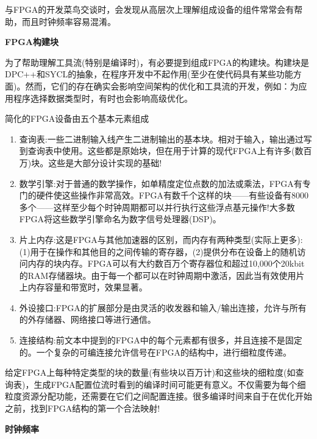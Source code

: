 与FPGA的开发菜鸟交谈时，会发现从高层次上理解组成设备的组件常常会有帮助，而且时钟频率容易混淆。\par

\hspace*{\fill} \par %
\textbf{FPGA构建块}

为了帮助理解工具流(特别是编译时)，有必要提到组成FPGA的构建块。构建块是DPC++和SYCL的抽象，在程序开发中不起作用(至少在使代码具有某些功能方面)。然而，它们的存在确实会影响空间架构的优化和工具流的开发，例如：为应用程序选择数据类型时，有时也会影响高级优化。\par

简化的FPGA设备由五个基本元素组成\par

\begin{enumerate}
	\item 查询表:一些二进制输入线产生二进制输出的基本块。相对于输入，输出通过写到查询表中使用。这些都是原始块，但在用于计算的现代FPGA上有许多(数百万)块。这些是大部分设计实现的基础!
	\item 数学引擎:对于普通的数学操作，如单精度定位点数的加法或乘法，FPGA有专门的硬件使这些操作非常高效。FPGA有数千个这样的块——有些设备有8000多个——这样至少每个时钟周期都可以并行执行这些浮点基元操作!大多数FPGA将这些数学引擎命名为数字信号处理器(DSP)。
	\item 片上内存:这是FPGA与其他加速器的区别，而内存有两种类型(实际上更多):(1)用于在操作和其他目的之间传输的寄存器，(2)提供分布在设备上的随机访问内存的块内存。FPGA可以有大约数百万个寄存器位和超过10,000个20kbit的RAM存储器块。由于每一个都可以在时钟周期中激活，因此当有效使用片上内存容量和带宽时，效果显著。
	\item 外设接口:FPGA的扩展部分是由灵活的收发器和输入/输出连接，允许与所有的外存储器、网络接口等进行通信。
	\item 连接结构:前文本中提到的FPGA中的每个元素都有很多，并且连接不是固定的。一个复杂的可编连接允许信号在FPGA的结构中，进行细粒度传递。
\end{enumerate}

给定FPGA上每种特定类型的块的数量(有些块以百万计)和这些块的细粒度(如查询表)，生成FPGA配置位流时看到的编译时间可能更有意义。不仅需要为每个细粒度资源分配功能，还需要在它们之间配置连接。很多编译时间来自于在优化开始之前，找到FPGA结构的第一个合法映射!\par

\hspace*{\fill} \par %
\textbf{时钟频率}

